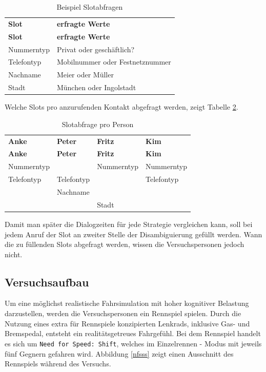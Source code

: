 \documentclass[12pt,a4paper]{scrartcl}
\begin{document}
\begin{longtable}{p{6cm}p{8cm}}
	\label{slots}\\
	\caption[Slotabfragen]{Beispiel Slotabfragen}\\
	\hline
	\textbf{Slot} &	\textbf{erfragte Werte}\\
	\hline
	\endfirsthead
	\hline
	\textbf{Slot} &	\textbf{erfragte Werte}\\
	\hline
	\endhead
Nummerntyp & Privat oder geschäftlich?\\
Telefontyp & Mobilnummer oder Festnetznummer\\
Nachname & Meier oder Müller\\
Stadt & München oder Ingolstadt\\


\hline
\end{longtable}
\newpage
Welche Slots pro anzurufenden Kontakt abgefragt werden, zeigt Tabelle \ref{slotsPerson}. 

\begin{longtable}{p{}p{}p{}p{}}
	\label{slotsPerson}\\
	\caption[Slotabfrage pro Person]{Slotabfrage pro Person}\\
	\hline
	\textbf{Anke}&\textbf{Peter}&\textbf{Fritz} &\textbf{Kim}\\
	\hline
	\endfirsthead
	\hline
	\textbf{Anke}&\textbf{Peter}&\textbf{Fritz} &\textbf{Kim}\\
	\hline
	\endhead
Nummerntyp & & Nummerntyp & Nummerntyp\\
Telefontyp & Telefontyp & & Telefontyp \\
& Nachname & & \\
& & Stadt & \\

\hline
\end{longtable}

Damit man später die Dialogzeiten für jede Strategie vergleichen kann, soll bei jedem Anruf der Slot an zweiter Stelle der Disambiguierung gefüllt werden. Wann die zu füllenden Slots abgefragt werden, wissen die Versuchspersonen jedoch nicht.  

\subsection{Versuchsaufbau}
Um eine möglichst realistische Fahrsimulation mit hoher kognitiver Belastung darzustellen, werden die Versuchspersonen ein Rennspiel spielen. Durch die Nutzung eines extra für Rennspiele konzipierten Lenkrads, inklusive Gas- und Bremspedal, entsteht ein realitätsgetreues Fahrgefühl. Bei dem Rennspiel handelt es sich um \texttt{Need for Speed: Shift}, welches im Einzelrennen - Modus mit jeweils fünf Gegnern gefahren wird. Abbildung \ref{nfsss} zeigt einen Ausschnitt des Rennspiels während des Versuchs. 
\end{document}
